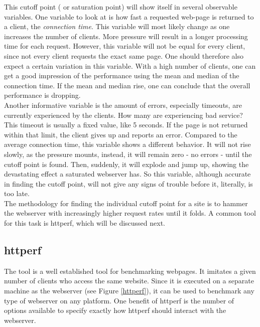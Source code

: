 This cutoff point ( or saturation point) will show itself in several observable variables. One variable to look at is how fast a requested web-page is returned to a client, the \emph{connection time}. This variable will most likely change as one increases the number of clients. More pressure will result in a longer processing time for each request. However, this variable will not be equal for every client, since not every client requests the exact same page. One should therefore also expect a certain variation in this variable. With a high number of clients, one can get a good impression of the performance using the mean and median of the connection time. If the mean and median rise, one can conclude that the overall performance is dropping.\\

Another informative variable is the amount of errors, especially timeouts, are currently experienced by the clients. How many are experiencing bad service? This timeout is usually a fixed value, like 5 seconds. If the page is not returned within that limit, the client gives up and reports an error. Compared to the average connection time, this variable shows a different behavior. It will not rise slowly, as the pressure mounts, instead, it will remain zero - no errors - until the cutoff point is found. Then, suddenly, it will explode and jump up, showing the devastating effect a saturated webserver has. So this variable, although accurate in finding the cutoff point, will not give any signs of trouble before it, literally, is too late.\\

The methodology for finding the individual cutoff point for a site is to hammer the webserver with increasingly higher request rates until it folds. A common tool for this task is httperf, which will be discussed next.

\subsection{httperf}

The tool \Verb@httperf@ is a well established tool for benchmarking webpages. It imitates a given number of clients who access the same website. Since it is executed on a separate machine as the webserver (see Figure \ref{httperf}), it can be used to benchmark any type of webserver on any platform. One benefit of httperf is the number of options available to specify exactly how httperf should interact with the webserver.

